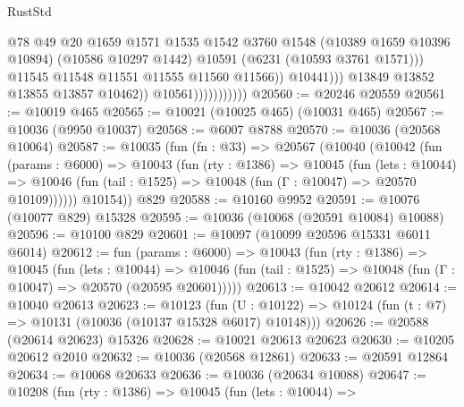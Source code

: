 \begin{lexlean}{RustStd}
\begin{coremodule}
{{                                          @78
                                          @49
                                          @20
                                          @1659
                                          @1571
                                          @1535
                                          @1542
                                          @3760
                                          @1548
                                          (@10389 @1659 @10396 @10894)
                                          (@10586 @10297 @1442)
                                          @10591
                                          (@6231 (@10593 @3761 @1571)))
                                        @11545
                                        @11548
                                        @11551
                                        @11555
                                        @11560
                                        @11566))
                                    @10441)))
                              @13849
                              @13852
                              @13855
                              @13857
                              @10462))
                          @10561)))))))))))
@20560 := @20246 @20559
@20561 := @10019 @465
@20565 := @10021 (@10025 @465) (@10031 @465)
@20567 := @10036 (@9950 @10037)
@20568 := @6007 @8788
@20570 := @10036 (@20568 @10064)
@20587 := @10035
    (fun (fn : @33) =>
    @20567
      (@10040
        (@10042
          (fun (params : @6000) =>
          @10043
            (fun (rty : @1386) =>
            @10045
              (fun (lets : @10044) =>
              @10046 (fun (tail : @1525) => @10048 (fun (Γ : @10047) => @20570 @10109))))))
        @10154))
    @829
@20588 := @10160 @9952
@20591 := @10076 (@10077 @829) @15328
@20595 := @10036 (@10068 (@20591 @10084) @10088)
@20596 := @10100 @829
@20601 := @10097 (@10099 @20596 @15331 @6011 @6014)
@20612 := fun (params : @6000) =>
  @10043
    (fun (rty : @1386) =>
    @10045
      (fun (lets : @10044) =>
      @10046 (fun (tail : @1525) => @10048 (fun (Γ : @10047) => @20570 (@20595 @20601)))))
@20613 := @10042 @20612
@20614 := @10040 @20613
@20623 := @10123
    (fun (U : @10122) => @10124 (fun (t : @7) => @10131 (@10036 (@10137 @15328 @6017) @10148)))
@20626 := @20588 (@20614 @20623) @15326
@20628 := @10021 @20613 @20623
@20630 := @10205 @20612 @2010
@20632 := @10036 (@20568 @12861)
@20633 := @20591 @12864
@20634 := @10068 @20633
@20636 := @10036 (@20634 @10088)
@20647 := @10208
    (fun (rty : @1386) =>
    @10045
      (fun (lets : @10044) =>
}}
\end{coremodule}
\end{lexlean}
